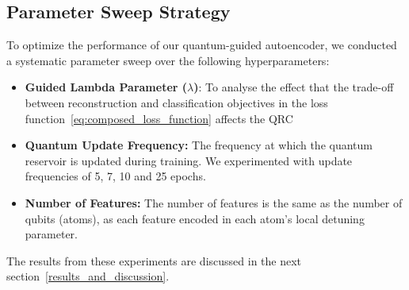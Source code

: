 \documentclass[conference]{IEEEtran}
\begin{document}
    
    
    


\subsection{Parameter Sweep Strategy}
To optimize the performance of our quantum-guided autoencoder, 
we conducted a systematic parameter sweep over the following hyperparameters:
\begin{itemize}
    \item \textbf{Guided Lambda Parameter (\( \lambda \))}: 
    To analyse the effect that the trade-off between reconstruction and classification objectives in the loss function~\ref{eq:composed_loss_function} affects
    the QRC
    
    \item \textbf{Quantum Update Frequency:} 
    The frequency at which the quantum reservoir is updated during training. We experimented with update frequencies of 5, 7, 10 and 25 epochs.


    \item \textbf{Number of Features:}
    The number of features is the same as the number of qubits (atoms), 
    as each feature encoded in each atom's local detuning parameter.
    
\end{itemize}
The results from these experiments are discussed in the next section~\ref{results_and_discussion}.

\end{document}
